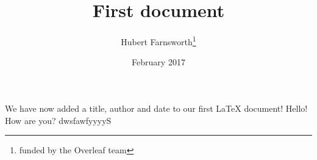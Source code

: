 \documentclass[12pt, letterpaper, twoside]{article}    %
\title{First document}
\author{Hubert Farnsworth\thanks{funded by the Overleaf team}}
\date{February 2017}
\begin{document}
\maketitle

We have now added a title, author and date to our first \LaTeX{} document!
Hello! How are you? dwsfawfyyyyS
\end{document}
